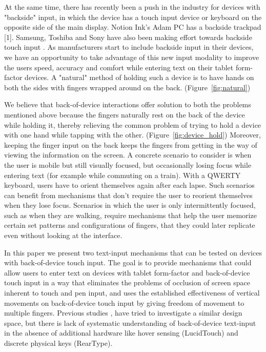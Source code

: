 At the same time, there has recently been a push in the industry for devices with "backside" input, in which the device has a touch input device or keyboard on the opposite side of the main display. Notion Ink's Adam PC has a backside trackpad [1]. Samsung, Toshiba and Sony have also been making effort towards backside touch input . As manufacturers start to include backside input in their devices, we have an opportunity to take advantage of this new input modality to improve the users speed, accuracy and comfort while entering text on their tablet form-factor devices. A "natural" method of holding such a device is to have hands on both the sides with fingers wrapped around on the back. \cite{Vogel} (Figure~\ref{fig:natural})

We believe that back-of-device interactions offer solution to both the problems mentioned above because the fingers naturally rest on the back of the device while holding it, thereby relieving the common problem of trying to hold a device with one hand while tapping with the other. (Figure~\ref{fig:device_hold}) Moreover, keeping the finger input on the back keeps the fingers from getting in the way of viewing the information on the screen. A concrete scenario to consider is when the user is mobile but still visually focused, but occasionally losing focus while entering text (for example while commuting on a train).  With a QWERTY keyboard, users have to orient themselves again after each lapse. Such scenarios can benefit from mechanisms that don't require the user to reorient themselves when they lose focus.  Scenarios in which the user is only intermittently focused, such as when they are walking, require mechanisms that help the user memorize certain set patterns and configurations of fingers, that they could later replicate even without looking at the interface. 

In this paper we present two text-input mechanisms that can be tested on devices with back-of-device touch input. The goal is to provide mechanisms that could allow users to enter text on devices with tablet form-factor and back-of-device touch input in a way that eliminates the problems of occlusion of screen space inherent to touch and pen input, and uses the established effectiveness of vertical movements on back-of-device touch input \cite{Wobbrock} by giving freedom of movement to multiple fingers. Previous studies \cite{RearType},\cite{LucidTouch} have tried to investigate a similar design space, but there is lack of systematic understanding of back-of-device text-input in the absence of additional hardware like hover sensing (LucidTouch) and discrete physical keys (RearType). 

